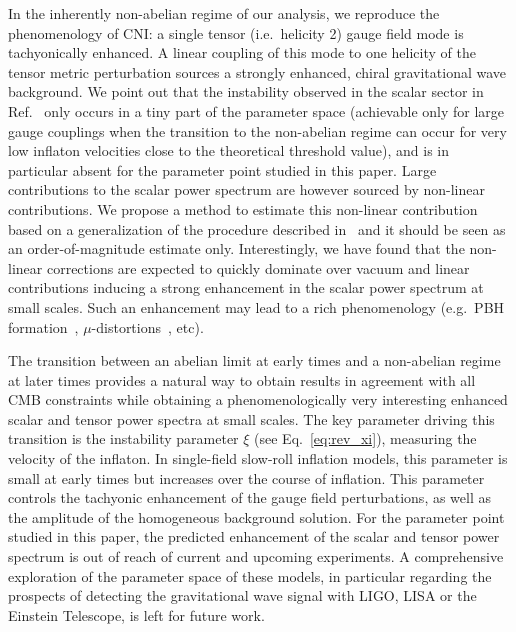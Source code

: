In the inherently non-abelian regime of our analysis, we reproduce the phenomenology of CNI: a single tensor (i.e.\ helicity 2) gauge field mode is tachyonically enhanced. A linear coupling of this mode to one helicity of the tensor metric perturbation sources a strongly enhanced, chiral gravitational wave background.  We point out that the instability observed in the scalar sector in Ref.~\cite{Dimastrogiovanni:2012ew} only occurs in a tiny part of the parameter space (achievable only for large gauge couplings when the transition to the non-abelian regime can occur for very low inflaton velocities close to the theoretical threshold value), and is in particular absent for the parameter point studied in this paper. Large contributions to the scalar power spectrum are however sourced by non-linear contributions. We propose a method to  estimate this non-linear contribution based on a generalization of the procedure described in~\cite{Linde:2012bt} and it should be seen as an order-of-magnitude estimate only. Interestingly, we have found that the non-linear corrections are expected to quickly dominate over vacuum and linear contributions inducing a strong enhancement in the scalar power spectrum at small scales. Such an enhancement may lead to a rich phenomenology (e.g.\ PBH formation~\cite{Linde:2012bt, Domcke:2017fix,Garcia-Bellido:2016dkw}, $\mu$-distortions~\cite{Meerburg:2012id}, etc).

The transition between an abelian limit at early times and a non-abelian regime at later times provides a natural way to obtain results in agreement with all CMB constraints while obtaining a phenomenologically very interesting enhanced scalar and tensor power spectra at small scales. The key parameter driving this transition is the instability parameter $\xi$ (see Eq.~\eqref{eq:rev_xi}), measuring the velocity of the inflaton. In single-field slow-roll inflation models, this parameter is small at early times but increases over the course of inflation. This parameter controls the tachyonic enhancement of the gauge field perturbations, as well as the amplitude of the homogeneous background solution. For the parameter point studied in this paper, the predicted enhancement of the scalar and tensor power spectrum is out of reach of current and upcoming experiments. A comprehensive exploration of the parameter space of these models, in particular regarding the prospects of detecting the gravitational wave signal with LIGO, LISA or the Einstein Telescope, is left for future work.

